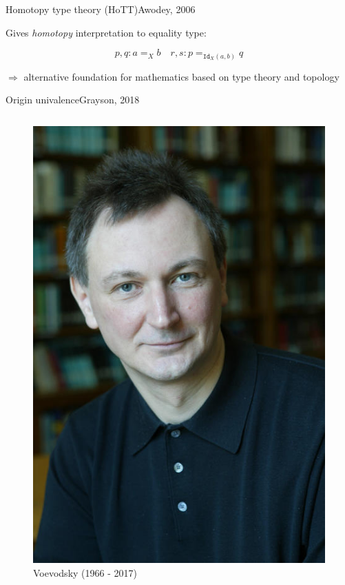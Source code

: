 \documentclass[english,handout]{beamer}
\begin{document}
\begin{frame}{Homotopy type theory (HoTT)}{Awodey, 2006}



Gives \emph{homotopy} interpretation to equality type:

\centering
$$ p,q : a =_X b \quad r,s : p =_{\texttt{Id}_X(a,b)} q$$ 




$\Rightarrow$ alternative foundation for mathematics based on type theory and topology

\end{frame}




\begin{frame}{Origin univalence}{Grayson, 2018}

\begin{columns}[c]
        \begin{center}
            \begin{figure}[h!]
                \includegraphics[height=.7\textheight]{figures/voevodsky.jpg}
                \caption{Voevodsky (1966 - 2017)}
            \end{figure} 
        \end{center}


\end{columns}
\end{frame}
\end{document}
